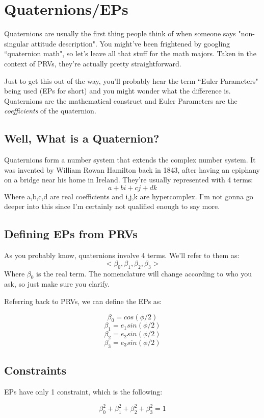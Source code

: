 \documentclass[a4paper,14pt]{extreport}
\begin{document}
\chapter{Quaternions/EPs}

Quaternions are usually the first thing people think of when someone says "non-singular attitude description". You might've been frightened by googling ``quaternion math", so let's leave all that stuff for the math majors. Taken in the context of PRVs, they're actually pretty straightforward.

Just to get this out of the way, you'll probably hear the term ``Euler Parameters" being used (EPs for short) and you might wonder what the difference is. Quaternions are the mathematical construct and Euler Parameters are the \emph{coefficients} of the quaternion.\\
 
\section{Well, What is a Quaternion?}
Quaternions form a number system that extends the complex number system. It was invented by William Rowan Hamilton back in 1843, after having an epiphany on a bridge near his home in Ireland. They're usually represented with 4 terms:
\[
a + bi + cj + dk
\]
Where a,b,c,d are real coefficients and i,j,k are hypercomplex. I'm not gonna go deeper into this since I'm certainly not qualified enough to say more.

\section{Defining EPs from PRVs}
As you probably know, quaternions involve 4 terms. We'll refer to them as:
\[<\beta_0,\beta_1,\beta_2,\beta_3>\]
Where $\beta_0$ is the real term. The nomenclature will change according to who you ask, so just make sure you clarify.

Referring back to PRVs, we can define the EPs as:

\[\beta_0 = cos(\phi/2)\]
\[\beta_1 = e_1 sin(\phi/2)\]
\[\beta_2 = e_2 sin(\phi/2)\]
\[\beta_3 = e_3 sin(\phi/2)\]

\section{Constraints}
EPs have only 1 constraint, which is the following:\

\[\beta_0^2+\beta_1^2+\beta_2^2+\beta_3^2=1\]
\end{document}
